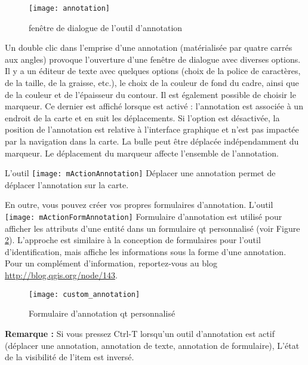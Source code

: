 \begin{figure}[ht]
   \centering
   \texttt{[image: annotation]}
   \caption{fenêtre de dialogue de l'outil d'annotation \nixcaption}
   \label{fig:annotation}
\end{figure}

Un double clic dans l'emprise d'une annotation (matérialisée par quatre carrés 
aux angles) provoque l'ouverture d'une fenêtre de dialogue avec diverses options. 
Il y a un éditeur de texte avec quelques options (choix de la police de caractères, 
de la taille, de la graisse, etc.), le choix de la couleur de fond du cadre, 
ainsi que de la couleur et de l'épaisseur du contour. Il est également possible 
de choisir le marqueur. Ce dernier est affiché lorsque  est activé : l'annotation est associée à un endroit de la carte et 
en suit les déplacements. Si l'option est désactivée, la position de l'annotation 
est relative à l'interface graphique et n'est pas impactée par la navigation dans 
la carte. La bulle peut être déplacée indépendamment du marqueur. Le déplacement 
du marqueur affecte l'ensemble de l'annotation.

L'outil \texttt{[image: mActionAnnotation]} Déplacer une 
annotation permet de déplacer l'annotation sur la carte.  

 

En outre, vous pouvez créer vos propres formulaires d'annotation. L'outil \texttt{[image: mActionFormAnnotation]} Formulaire d'annotation est utilisé pour afficher les attributs d'une entité dans un formulaire qt personnalisé (voir Figure \ref{fig:custom-annotations}). L'approche est similaire à la conception de formulaires pour l'outil d'identification, mais affiche les informations sous la forme d'une annotation. Pour un complément d'information, reportez-vous au blog \url{http://blog.qgis.org/node/143}.

\begin{figure}[ht]
   \centering
   \texttt{[image: custom\_annotation]}
   \caption{Formulaire d'annotation qt personnalisé \nixcaption}
   \label{fig:custom-annotations}
\end{figure}

\textbf{Remarque :} Si vous pressez Ctrl-T lorsqu'un outil d'annotation est actif
(déplacer une annotation, annotation de texte, annotation de formulaire), L'état de 
la visibilité de l'item est inversé.

